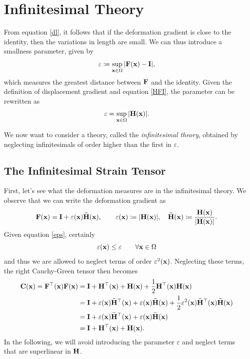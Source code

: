 \chapter{Infinitesimal Theory}\label{inf}

From equation \eqref{dl}, it follows that if the deformation gradient is close to the identity, then the variations in length are small. We can thus introduce a smallness parameter, given by
\begin{equation}
	\varepsilon\coloneqq\sup_{\mathbf{x}\in\Omega}|\mathbf{F}(\mathbf{x})-\mathbf{I}|,
\end{equation}
which measures the greatest distance between \(\mathbf{F}\) and the identity. Given the definition of displacement gradient and equation \eqref{HFI}, the parameter can be rewritten as
\begin{equation}\label{eps}
	\varepsilon=\sup_{\mathbf{x}\in\Omega}|\mathbf{H}(\mathbf{x})|.
\end{equation}

We now want to consider a theory, called the \textit{infinitesimal theory}, obtained by neglecting infinitesimals of order higher than the first in \(\varepsilon\).


\section{The Infinitesimal Strain Tensor}

First, let's see what the deformation measures are in the infinitesimal theory. We observe that we can write the deformation gradient as
\begin{equation}
	\mathbf{F}(\mathbf{x})=\mathbf{I} +\varepsilon(\mathbf{x}) \widetilde{\mathbf{H}}(\mathbf{x}), \qquad \varepsilon(\mathbf{x})\coloneqq |\mathbf{H}(\mathbf{x})|, \quad \widetilde{\mathbf{H}}(\mathbf{x})\coloneqq \frac{\mathbf{H}(\mathbf{x})}{|\mathbf{H}(\mathbf{x})|}.
\end{equation}
Given equation \eqref{eps}, certainly
\begin{equation}
	\varepsilon(\mathbf{x})\leq \varepsilon \qquad \forall \mathbf{x}\in \Omega
\end{equation}
and thus we are allowed to neglect terms of order \(\varepsilon^2(\mathbf{x})\). Neglecting these terms, the right Cauchy-Green tensor then becomes
\begin{equation}\label{Cap}
	\begin{aligned}
		\mathbf{C}(\mathbf{x})=	\mathbf{F}^\top(\mathbf{x})\mathbf{F}(\mathbf{x})& =\mathbf{I+H^\top(x)+H(x)}+\frac12\mathbf{H}^\top(\mathbf{x})\mathbf{H}(\mathbf{x}) \\
		&=\mathbf{I}+\varepsilon(\mathbf{x})\widetilde{\mathbf{H}}^\top(\mathbf{x})+\varepsilon(\mathbf{x})\widetilde{\mathbf{H}}(\mathbf{x})+\frac12\varepsilon^2(\mathbf{x})\widetilde{\mathbf{H}}^\top(\mathbf{x})\widetilde{\mathbf{H}}(\mathbf{x}) \\
		&=\mathbf{I}+\varepsilon(\mathbf{x})\widetilde{\mathbf{H}}^\top(\mathbf{x})+\varepsilon(\mathbf{x})\widetilde{\mathbf{H}}(\mathbf{x}) \\
		&=\mathbf{I+H^\top(x)+H(x)}.
	\end{aligned}
\end{equation}
In the following, we will avoid introducing the parameter \(\varepsilon\) and neglect terms that are superlinear in \(\mathbf{H}\).

